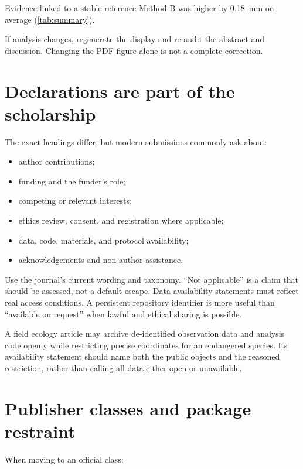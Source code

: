 \begin{latexcode}{Evidence linked to a stable reference}
Method B was higher by \SI{0.18}{\milli\metre} on
average (\cref{tab:summary}).
\end{latexcode}

If analysis changes, regenerate the display and re-audit the abstract and
discussion. Changing the PDF figure alone is not a complete correction.

\section{Declarations are part of the scholarship}

The exact headings differ, but modern submissions commonly ask about:

\begin{itemize}
  \item author contributions;
  \item funding and the funder's role;
  \item competing or relevant interests;
  \item ethics review, consent, and registration where applicable;
  \item data, code, materials, and protocol availability;
  \item acknowledgements and non-author assistance.
\end{itemize}

Use the journal's current wording and taxonomy. ``Not applicable'' is a claim
that should be assessed, not a default escape. Data availability statements
must reflect real access conditions. A persistent repository identifier is more
useful than ``available on request'' when lawful and ethical sharing is possible.

\begin{scienceinpractice}
A field ecology article may archive de-identified observation data and analysis
code openly while restricting precise coordinates for an endangered species.
Its availability statement should name both the public objects and the reasoned
restriction, rather than calling all data either open or unavailable.
\end{scienceinpractice}

\section{Publisher classes and package restraint}

When moving to an official class:

